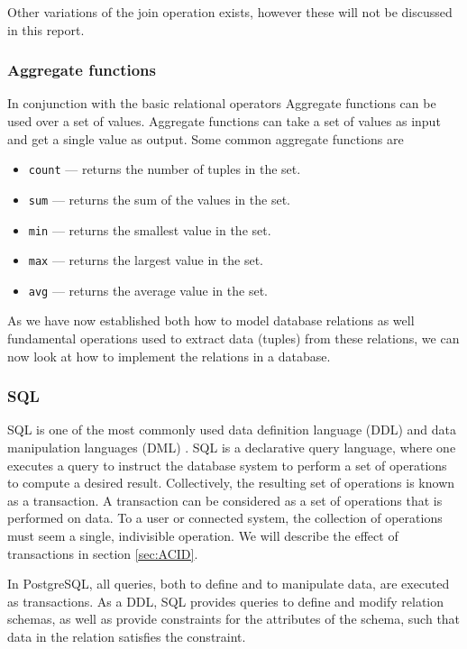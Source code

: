 Other variations of the join operation exists\cite{DBSBook}, however these will not be discussed in this report.\\
\subsubsection*{Aggregate functions}
In conjunction with the basic relational operators Aggregate functions can be used over a set of values.
Aggregate functions can take a set of values as input and get a single value as output\cite{DBSBook}. Some common aggregate functions are 
\begin{itemize} \label{aggregateFunctions}
    \item \texttt{count} --- returns the number of tuples in the set.
    \item \texttt{sum} --- returns the sum of the values in the set.
    \item \texttt{min} --- returns the smallest value in the set.
    \item \texttt{max} --- returns the largest value in the set.
    \item \texttt{avg} --- returns the average value in the set.
\end{itemize}


As we have now established both how to model database relations as well fundamental operations used to extract data (tuples) from these relations, we can now look at how to implement the relations in a database.

\subsubsection{SQL}\label{sec:SQL}
SQL is one of the most commonly used data definition language (DDL) and data manipulation languages (DML) \cite{DBSBook}.
SQL is a declarative query language, where one executes a query to instruct the database system to perform a set of operations to compute a desired result.
Collectively, the resulting set of operations is known as a transaction.
A transaction can be considered as a set of operations that is performed on data.
To a user or connected system, the collection of operations must seem a single, indivisible operation\cite{DBSBook}.
We will describe the effect of transactions in section \ref{sec:ACID}.


In PostgreSQL, all queries, both to define and to manipulate data, are executed as transactions\cite{postgres_transactions}.
As a DDL, SQL provides queries to define and modify relation schemas, as well as provide constraints for the attributes of the schema, such that data in the relation satisfies the constraint.  

